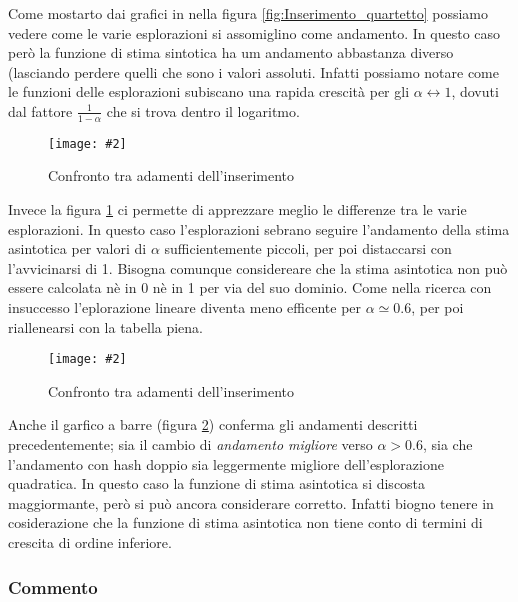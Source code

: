 \documentclass{article}
\newcommand{\image}[3][1]{
	\centering
	\texttt{[image: \#2]}
	\caption{#3}
}
\begin{document}
Come mostarto dai grafici in nella figura \ref{fig:Inserimento_quartetto} possiamo vedere come le varie esplorazioni si assomiglino come andamento. In questo caso però la funzione di stima sintotica ha um andamento abbastanza diverso (lasciando perdere quelli che sono i valori assoluti. Infatti possiamo notare come le funzioni delle esplorazioni subiscano una rapida crescità per gli $\alpha \longleftrightarrow 1$, dovuti dal fattore $\frac{1}{1 - \alpha}$ che si trova dentro il logaritmo. 

\begin{figure}[H]
\image[0.75]{Inserimento_Confronto_asintotico_scala_logaritmica}{Confronto tra adamenti dell'inserimento}
\label{fig:Inserimento_Confronto_asintotico_scala_logaritmica}
\end{figure}

Invece la figura \ref{fig:Inserimento_Confronto_asintotico_scala_logaritmica} ci permette di apprezzare meglio le differenze tra le varie esplorazioni. In questo caso l'esplorazioni sebrano seguire l'andamento della stima asintotica per valori di $\alpha$ sufficientemente piccoli, per poi distaccarsi con l'avvicinarsi di 1. Bisogna comunque considereare che la stima asintotica non può essere calcolata nè in 0 nè in 1 per via del suo dominio.
Come nella ricerca con insuccesso l'eplorazione lineare diventa meno efficente per $\alpha \simeq 0.6$, per poi riallenearsi con la tabella piena.

\begin{figure}[H]
\image[0.75]{Inserimento_Confronto_barre_scala_logaritmica}{Confronto tra adamenti dell'inserimento}
\label{fig:Inserimento_Confronto_barre_scala_logaritmica}
\end{figure}

Anche il garfico a barre (figura \ref{fig:Inserimento_Confronto_barre_scala_logaritmica}) conferma gli andamenti descritti precedentemente; sia il cambio di \emph{andamento migliore} verso $\alpha > 0.6$, sia che l'andamento con hash doppio sia leggermente migliore dell'esplorazione quadratica. In questo caso la funzione di stima asintotica si discosta maggiormante, però si può ancora considerare corretto. Infatti biogno tenere in cosiderazione che la funzione di stima asintotica non tiene conto di termini di crescita di ordine inferiore.

\subsubsection{Commento}
\end{document}
